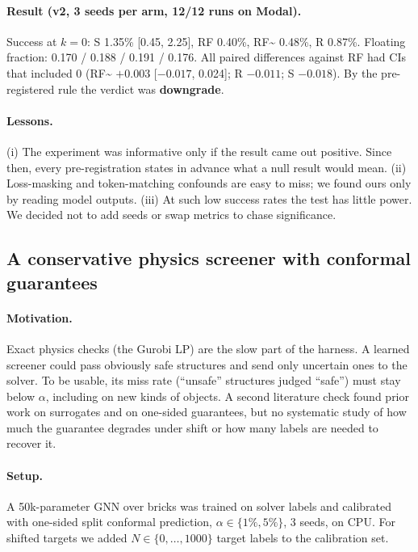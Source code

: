 \paragraph{Result (v2, 3 seeds per arm, 12/12 runs on Modal).} Success at $k{=}0$: S 1.35\% [0.45, 2.25], RF 0.40\%, RF\~{} 0.48\%, R 0.87\%. Floating fraction: 0.170 / 0.188 / 0.191 / 0.176. All paired differences against RF had CIs that included 0 (RF\~{} $+0.003$ [$-0.017$, 0.024]; R $-0.011$; S $-0.018$). By the pre-registered rule the verdict was \textbf{downgrade}.

\paragraph{Lessons.} (i) The experiment was informative only if the result came out positive. Since then, every pre-registration states in advance what a null result would mean. (ii) Loss-masking and token-matching confounds are easy to miss; we found ours only by reading model outputs. (iii) At such low success rates the test has little power. We decided not to add seeds or swap metrics to chase significance.

\subsection{A conservative physics screener with conformal guarantees}
\label{ex:screen}
\paragraph{Motivation.} Exact physics checks (the Gurobi LP) are the slow part of the harness. A learned screener could pass obviously safe structures and send only uncertain ones to the solver. To be usable, its miss rate (``unsafe'' structures judged ``safe'') must stay below $\alpha$, including on new kinds of objects. A second literature check found prior work on surrogates and on one-sided guarantees, but no systematic study of how much the guarantee degrades under shift or how many labels are needed to recover it.

\paragraph{Setup.} A 50k-parameter GNN over bricks was trained on solver labels and calibrated with one-sided split conformal prediction, $\alpha\in\{1\%,5\%\}$, 3 seeds, on CPU. For shifted targets we added $N\in\{0,\dots,1000\}$ target labels to the calibration set.

